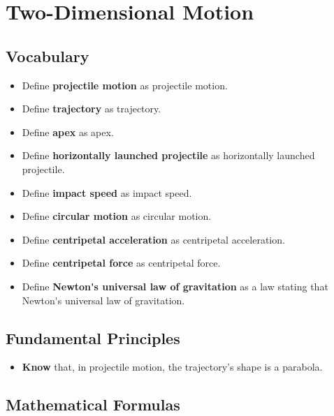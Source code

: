 \documentclass[dvipsnames]{article}
\begin{document}
\clearpage

\section{Two-Dimensional Motion}

\subsection*{Vocabulary}

\vspace{-6pt}

\begin{itemize}[itemsep=0pt]
    \item Define \textbf{\gls{projectile motion}} as \glsdesc{projectile motion}.
    \item Define \textbf{\gls{trajectory}} as \glsdesc{trajectory}.
    \item Define \textbf{\gls{apex}} as \glsdesc{apex}.
    \item Define \textbf{\gls{horizontally launched projectile}} as \glsdesc{horizontally launched projectile}.
    \item Define \textbf{\gls{impact speed}} as \glsdesc{impact speed}.
    \item Define \textbf{\gls{circular motion}} as \glsdesc{circular motion}.
    \item Define \textbf{\gls{centripetal acceleration}} as \glsdesc{centripetal acceleration}.
    \item Define \textbf{\gls{centripetal force}} as \glsdesc{centripetal force}.
    \item Define \textbf{\gls{Newton's universal law of gravitation}} as a law stating that \glsdesc{Newton's universal law of gravitation}.
\end{itemize}

\subsection*{Fundamental Principles}

\begin{itemize}[itemsep=0pt]
    \item \textbf{Know} that, in projectile motion, the trajectory's shape is a parabola.
\end{itemize}

\subsection*{Mathematical Formulas}
\end{document}

